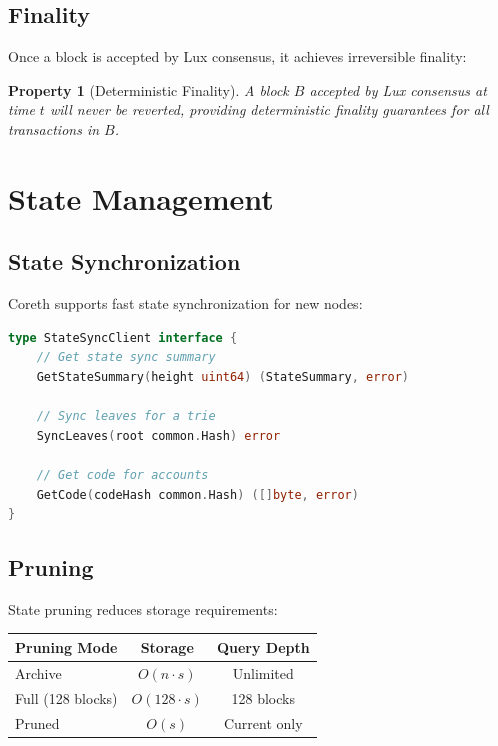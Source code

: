 \documentclass[11pt,letterpaper]{article}
\newtheorem{property}{Property}
\begin{document}
\subsection{Finality}

Once a block is accepted by Lux consensus, it achieves irreversible finality:

\begin{property}[Deterministic Finality]
A block $B$ accepted by Lux consensus at time $t$ will never be reverted, providing deterministic finality guarantees for all transactions in $B$.
\end{property}

\section{State Management}

\subsection{State Synchronization}

Coreth supports fast state synchronization for new nodes:

\begin{lstlisting}[language=Go, caption=State Sync Interface]
type StateSyncClient interface {
    // Get state sync summary
    GetStateSummary(height uint64) (StateSummary, error)

    // Sync leaves for a trie
    SyncLeaves(root common.Hash) error

    // Get code for accounts
    GetCode(codeHash common.Hash) ([]byte, error)
}
\end{lstlisting}

\subsection{Pruning}

State pruning reduces storage requirements:

\begin{center}
\begin{tabular}{lcc}
\toprule
\textbf{Pruning Mode} & \textbf{Storage} & \textbf{Query Depth} \\
\midrule
Archive & $O(n \cdot s)$ & Unlimited \\
Full (128 blocks) & $O(128 \cdot s)$ & 128 blocks \\
Pruned & $O(s)$ & Current only \\
\bottomrule
\end{tabular}
\end{center}
\end{document}
